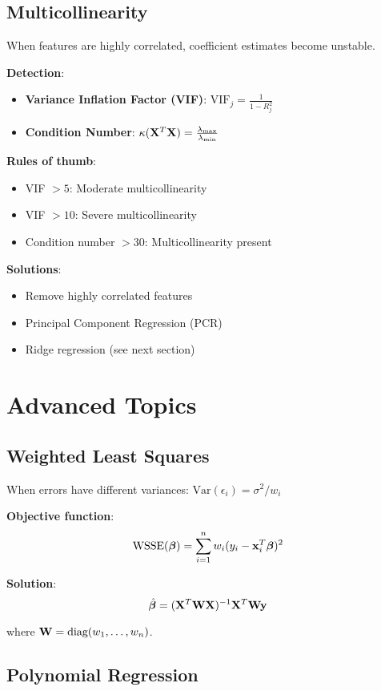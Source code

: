 \documentclass{article}
\begin{document}
\subsection{Multicollinearity}

When features are highly correlated, coefficient estimates become unstable.

\textbf{Detection}:
\begin{itemize}
    \item \textbf{Variance Inflation Factor (VIF)}: $\text{VIF}_j = \frac{1}{1-R_j^2}$
    \item \textbf{Condition Number}: $\kappa(\mathbf{X}^T\mathbf{X}) = \frac{\lambda_{\max}}{\lambda_{\min}}$
\end{itemize}

\textbf{Rules of thumb}:
\begin{itemize}
    \item VIF $> 5$: Moderate multicollinearity
    \item VIF $> 10$: Severe multicollinearity
    \item Condition number $> 30$: Multicollinearity present
\end{itemize}

\textbf{Solutions}:
\begin{itemize}
    \item Remove highly correlated features
    \item Principal Component Regression (PCR)
    \item Ridge regression (see next section)
\end{itemize}

\section{Advanced Topics}

\subsection{Weighted Least Squares}

When errors have different variances: $\text{Var}(\epsilon_i) = \sigma^2/w_i$

\textbf{Objective function}:
$$\text{WSSE}(\boldsymbol{\beta}) = \sum_{i=1}^n w_i(y_i - \mathbf{x}_i^T\boldsymbol{\beta})^2$$

\textbf{Solution}:
$$\hat{\boldsymbol{\beta}} = (\mathbf{X}^T\mathbf{W}\mathbf{X})^{-1}\mathbf{X}^T\mathbf{W}\mathbf{y}$$

where $\mathbf{W} = \text{diag}(w_1, \ldots, w_n)$.

\subsection{Polynomial Regression}
\end{document}
